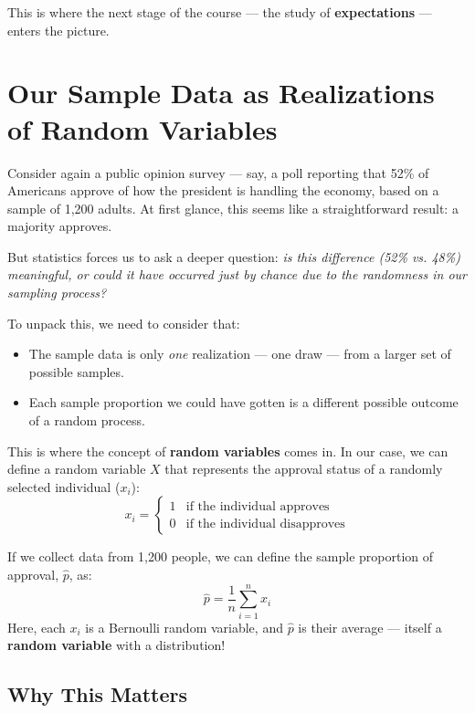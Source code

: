\documentclass[12pt]{article}
\begin{document}
This is where the next stage of the course — the study of \textbf{expectations} — enters the picture.

\section*{Our Sample Data as Realizations of Random Variables}

Consider again a public opinion survey — say, a poll reporting that 52\% of Americans approve of how the president is handling the economy, based on a sample of 1,200 adults. At first glance, this seems like a straightforward result: a majority approves.

But statistics forces us to ask a deeper question: \textit{is this difference (52\% vs. 48\%) meaningful, or could it have occurred just by chance due to the randomness in our sampling process?}

\vspace{0.5em}
\noindent
To unpack this, we need to consider that:
\begin{itemize}
    \item The sample data is only \textit{one} realization — one draw — from a larger set of possible samples.
    \item Each sample proportion we could have gotten is a different possible outcome of a random process.
\end{itemize}

\vspace{0.5em}
This is where the concept of \textbf{random variables} comes in. In our case, we can define a random variable $X$ that represents the approval status of a randomly selected individual ($x_i$):
\[
x_i =
\begin{cases}
1 & \text{if the individual approves} \\
0 & \text{if the individual disapproves}
\end{cases}
\]

\vspace{0.5em}
If we collect data from 1,200 people, we can define the sample proportion of approval, $\hat{p}$, as:
\[
\hat{p} = \frac{1}{n} \sum_{i=1}^{n} x_i
\]
Here, each $x_i$ is a Bernoulli random variable, and $\hat{p}$ is their average — itself a \textbf{random variable} with a distribution!

\subsection*{Why This Matters}
\end{document}
